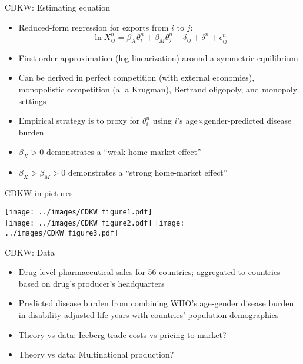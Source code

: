 \documentclass[11pt,notes=hide,aspectratio=169]{beamer}
\begin{document}
\begin{frame}{CDKW: Estimating equation}
\begin{itemize}
	\item Reduced-form regression for exports from $i$ to $j$:
	\begin{equation*}
		\ln X_{ij}^n = \beta_X \theta_i^n + \beta_M \theta_j^n +  \delta_{ij} + \delta^n + \epsilon_{ij}^n
	\end{equation*}
 	\item First-order approximation (log-linearization) around a symmetric equilibrium
 	\item Can be derived in perfect competition (with external economies), monopolistic competition (a la Krugman), Bertrand oligopoly, and monopoly settings
 	\item Empirical strategy is to proxy for $\theta_i^n$ using $i$'s age$\times$gender-predicted disease burden
 	\item $\beta_X > 0$ demonstrates a ``weak home-market effect''
 	\item $\beta_X > \beta_M > 0$ demonstrates a ``strong home-market effect''
\end{itemize}
\end{frame}
\begin{frame}{CDKW in pictures}
\begin{center}
\texttt{[image: ../images/CDKW\_figure1.pdf]}\\
\texttt{[image: ../images/CDKW\_figure2.pdf]}
\texttt{[image: ../images/CDKW\_figure3.pdf]}
\end{center}
\end{frame}
\begin{frame}{CDKW: Data}
\begin{itemize}
	\item Drug-level pharmaceutical sales for 56 countries; aggregated to countries based on drug's producer's headquarters
	\item Predicted disease burden from combining WHO's age-gender disease burden in disability-adjusted life years with countries' population demographics
	\item Theory vs data: Iceberg trade costs vs pricing to market?
	\item Theory vs data: Multinational production?
\end{itemize}
\end{frame}
\end{document}
